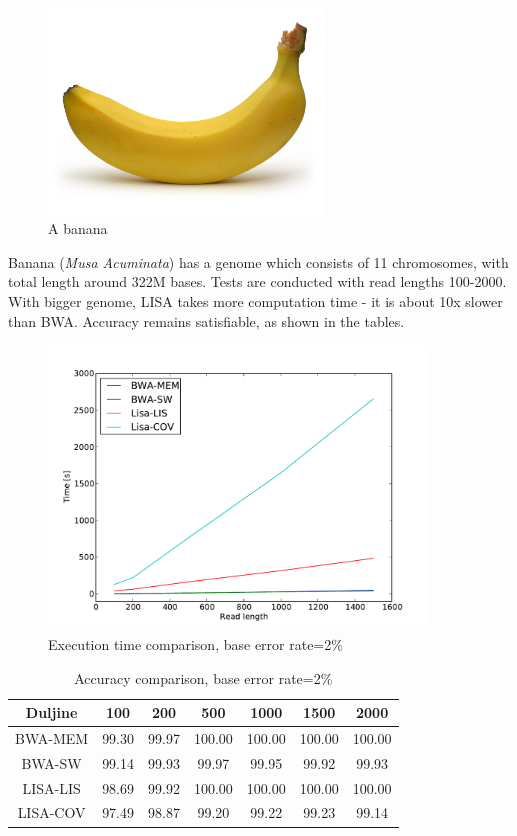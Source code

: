 \documentclass[times, utf8, diplomski]{fer}
\begin{document}
\begin{figure}[H]
\centering
\includegraphics[width=0.65\textwidth]{../img/banana.jpg}
\caption{A banana\cite{banana.img}}\label{banana}
\end{figure}

Banana (\emph{Musa Acuminata}) has a genome which consists of 11 chromosomes, with total length around 322M bases. Tests are conducted with read lengths 100-2000. With bigger genome, LISA takes more computation time - it is about 10x slower than BWA. Accuracy remains satisfiable, as shown in the tables.

\begin{figure}[H]
\centering
\includegraphics[width=0.9\textwidth]{../img/banana-e02-time.pdf}
\caption{Execution time comparison, base error rate=2\%}\label{banana-e02-time}
\end{figure}

\begin{table}[H]
\centering
\begin{tabular}{|c||c|c|c|c|c|c|}
\hline
	Duljine & 100 & 200 & 500 & 1000 & 1500 & 2000\\
\hline
\hline
	BWA-MEM & 99.30 & 99.97 & 100.00 & 100.00 & 100.00 & 100.00\\
\hline
	BWA-SW  & 99.14 & 99.93 & 99.97 & 99.95 & 99.92 & 99.93\\
\hline
	LISA-LIS   & 98.69 & 99.92 & 100.00 & 100.00 & 100.00 & 100.00\\
\hline
	LISA-COV & 97.49 & 98.87 & 99.20 & 99.22 & 99.23 & 99.14\\
\hline
\end{tabular}
\caption{Accuracy comparison, base error rate=2\%}\label{banana-e02-correct}
\end{table}
\end{document}
